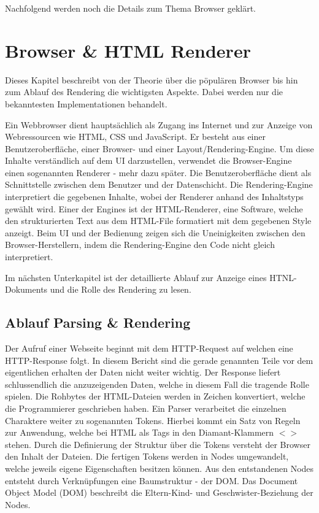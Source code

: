 Nachfolgend werden noch die Details zum Thema Browser geklärt.

\section{Browser \& HTML Renderer}

Dieses Kapitel beschreibt von der Theorie über die pöpulären Browser bis hin zum Ablauf des Rendering die wichtigsten Aspekte.
Dabei werden nur die bekanntesten Implementationen behandelt.

Ein Webbrowser dient hauptsächlich als Zugang ins Internet und zur Anzeige von Webressourcen wie HTML, CSS und JavaScript.
Er besteht aus einer Benutzeroberfläche, einer Browser- und einer Layout/Rendering-Engine.
Um diese Inhalte verständlich auf dem UI darzustellen, verwendet die Browser-Engine einen sogenannten Renderer - mehr dazu später.
Die Benutzeroberfläche dient als Schnittstelle zwischen dem Benutzer und der Datenschicht. 
Die Rendering-Engine interpretiert die gegebenen Inhalte, wobei der Renderer anhand des Inhaltstyps gewählt wird. 
Einer der Engines ist der HTML-Renderer, eine Software, welche den strukturierten Text aus dem HTML-File formatiert mit dem gegebenen Style anzeigt.
Beim UI und der Bedienung zeigen sich die Uneinigkeiten zwischen den Browser-Herstellern, indem die Rendering-Engine den Code nicht gleich interpretiert.

Im nächsten Unterkapitel ist der detaillierte Ablauf zur Anzeige eines HTNL-Dokuments und die Rolle des Rendering zu lesen.


\subsection{Ablauf Parsing \& Rendering}

Der Aufruf einer Webseite beginnt mit dem HTTP-Request auf welchen eine HTTP-Response folgt.
In diesem Bericht sind die gerade genannten Teile vor dem eigentlichen erhalten der Daten nicht weiter wichtig.
Der Response liefert schlussendlich die anzuzeigenden Daten, welche in diesem Fall die tragende Rolle spielen.
Die Rohbytes der HTML-Dateien werden in Zeichen konvertiert, welche die Programmierer geschrieben haben.
Ein Parser verarbeitet die einzelnen Charaktere weiter zu sogenannten Tokens.
Hierbei kommt ein Satz von Regeln zur Anwendung, welche bei HTML als Tags in den Diamant-Klammern $<>$ stehen.
Durch die Definierung der Struktur über die Tokens versteht der Browser den Inhalt der Dateien.
Die fertigen Tokens werden in Nodes umgewandelt, welche jeweils eigene Eigenschaften besitzen können.
Aus den entstandenen Nodes entsteht durch Verknüpfungen eine Baumstruktur - der DOM.
Das Document Object Model (DOM) beschreibt die Eltern-Kind- und Geschwister-Beziehung der Nodes.

